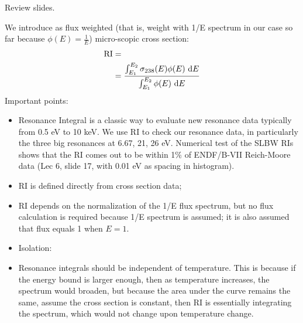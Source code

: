 \documentclass{school-22.211-notes}
\date{February 22, 2012}
\begin{document}
\maketitle

Review slides. 

We introduce  as flux weighted (that is, weight with 1/E spectrum in our case so far because $\phi(E) = \frac{1}{E}$) micro-scopic cross section:
\begin{align}
\mathrm{RI} &= \\
&=  \frac{\int_{E_1}^{E_2} \sigma_{238} (E) \phi(E) \mbox{ }\mathrm{d} E}{\int_{E_1}^{E_2} \phi (E) \mbox{ }\mathrm{d} E }  \\
\end{align}
Important points:
\begin{itemize}
\item Resonance Integral is a classic way to evaluate new resonance data typically from 0.5 eV to 10 keV. We use RI to check our resonance data, in particularly the three big resonances at 6.67, 21, 26 eV. Numerical test of the SLBW RIs shows that the RI comes out to be within 1\% of ENDF/B-VII Reich-Moore data (Lec 6, slide 17, with 0.01 eV as spacing in histogram). 
\item RI is defined directly from cross section data;
\item RI depends on the normalization of the 1/E flux spectrum, but no flux calculation is required because 1/E spectrum is assumed; it is also assumed that flux equals 1 when $E = 1$.  
\item Isolation: 
\item Resonance integrals should be independent of temperature. This is because if the energy bound is larger enough, then as temperature increases, the spectrum would broaden, but because the area under the curve remains the same, assume the cross section is constant, then RI is essentially integrating the spectrum, which would not change upon temperature change. 
\end{itemize}
\end{document}
